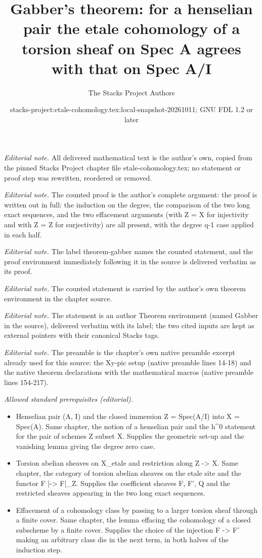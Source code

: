 \documentclass[10pt,a4paper]{amsart}
\title{Gabber's theorem: for a henselian pair the etale cohomology of a torsion sheaf on Spec A agrees with that on Spec A/I}
\author{The Stacks Project Authors}
\date{stacks-project:etale-cohomology.tex:local-snapshot-20261011; GNU FDL 1.2 or later}
\theoremstyle{plain}
\theoremstyle{definition}
\theoremstyle{remark}
\numberwithin{equation}{subsection}
\begin{document}
\maketitle
\noindent\textit{Editorial note.} All delivered mathematical text is the author's own, copied from the pinned Stacks Project chapter file etale-cohomology.tex; no statement or proof step was rewritten, reordered or removed.\par\medskip
\noindent\textit{Editorial note.} The counted proof is the author's complete argument: the proof is written out in full: the induction on the degree, the comparison of the two long exact sequences, and the two effacement arguments (with Z = X for injectivity and with Z = Z for surjectivity) are all present, with the degree q-1 case applied in each half.\par\medskip
\noindent\textit{Editorial note.} The label theorem-gabber names the counted statement, and the proof environment immediately following it in the source is delivered verbatim as its proof.\par\medskip
\noindent\textit{Editorial note.} The counted statement is carried by the author's own theorem environment in the chapter source.\par\medskip
\noindent\textit{Editorial note.} The statement is an author Theorem environment (named Gabber in the source), delivered verbatim with its label; the two cited inputs are kept as external pointers with their canonical Stacks tags.\par\medskip
\noindent\textit{Editorial note.} The preamble is the chapter's own native preamble excerpt already used for this source: the Xy-pic setup (native preamble lines 14-18) and the native theorem declarations with the mathematical macros (native preamble lines 154-217).\par\medskip
\noindent\textit{Allowed standard prerequisites (editorial).}\begin{itemize}
\item Henselian pair (A, I) and the closed immersion Z = Spec(A/I) into X = Spec(A). Same chapter, the notion of a henselian pair and the h\textasciicircum{}0 statement for the pair of schemes Z subset X. Supplies the geometric set-up and the vanishing lemma giving the degree zero case.
\item Torsion abelian sheaves on X\_etale and restriction along Z -> X. Same chapter, the category of torsion abelian sheaves on the etale site and the functor F |-> F|\_Z. Supplies the coefficient sheaves F, F', Q and the restricted sheaves appearing in the two long exact sequences.
\item Effacement of a cohomology class by passing to a larger torsion sheaf through a finite cover. Same chapter, the lemma effacing the cohomology of a closed subscheme by a finite cover. Supplies the choice of the injection F -> F' making an arbitrary class die in the next term, in both halves of the induction step.
\end{itemize}\medskip
\end{document}
